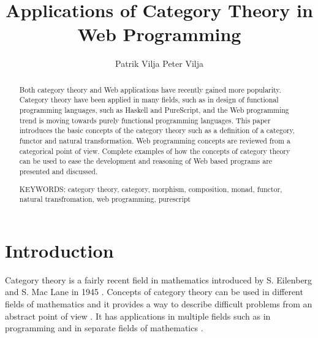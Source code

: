 \documentclass[article]{aaltoseries}
\begin{document}
 

\title{Applications of Category Theory in Web Programming}

\author{Patrik Vilja Peter Vilja} %


\maketitle


\begin{abstract}
  Both category theory and Web applications have recently gained more
  popularity. Category theory have been applied in many fields, such as in
  design of functional programming languages, such as Haskell and PureScript,
  and the Web programming trend is moving towards purely functional programming
  languages. This paper introduces the basic concepts of the category theory
  such as a definition of a category, functor and natural transformation. Web
  programming concepts are reviewed from a categorical point of view. Complete
  examples of how the concepts of category theory can be used to ease the
  development and reasoning of Web based programs are presented and discussed.

\vspace{3mm}
\noindent KEYWORDS: category theory, category, morphism, composition, monad,
functor, natural transfromation, web programming, purescript 

\end{abstract}



\section{Introduction}

  Category theory is a fairly recent field in mathematics introduced by S.
  Eilenberg and S. Mac Lane in 1945 \cite{awodey2006category,
    eilenberg1945general}. Concepts of category theory can be used in different
  fields of mathematics and it provides a way to describe difficult problems
  from an abstract point of view \cite{eilenberg1945general, mclarty2007last}.
  It has applications in multiple fields such as in programming and
  in separate fields of mathematics \cite{awodey2006category, jones1993glasgow,
    reynolds1980using}.
\end{document}
